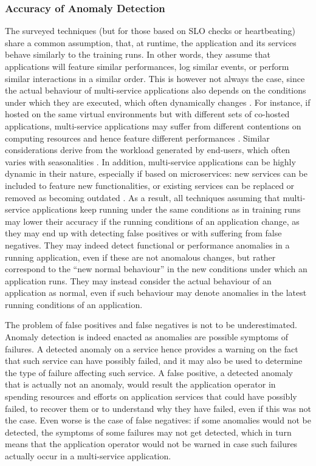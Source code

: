 \subsubsection{Accuracy of Anomaly Detection}
\label{sec:detection:discussion:adaptability}
The surveyed techniques (but for those based on SLO checks or heartbeating) share a common assumption, \viz that, at runtime, the application and its services behave similarly to the training runs.
In other words, they assume that applications will feature similar performances, log similar events, or perform similar interactions in a similar order. 
This is however not always the case, since the actual behaviour of multi-service applications also depends on the conditions under which they are executed, which often dynamically changes \cite{Soldani2018_MicroservicesPainsGains}.
For instance, if hosted on the same virtual environments but with different sets of co-hosted applications, multi-service applications may suffer from different contentions on computing resources and hence feature different performances \cite{Medel2018_ResourceManagementPerformanceKubernetes}.
Similar considerations derive from the workload generated by end-users, which often varies with seasonalities \cite{33_Mariani2020_PredictingFailures}.
In addition, multi-service applications can be highly dynamic in their nature, especially if based on microservices: new services can be included to feature new functionalities, or existing services can be replaced or removed as becoming outdated \cite{Soldani2018_MicroservicesPainsGains}.
As a result, all techniques assuming that multi-service applications keep running under the same conditions as in training runs may lower their accuracy if the running conditions of an application change, as they may end up with detecting false positives or with suffering from false negatives.
They may indeed detect functional or performance anomalies in a running application, even if these are not anomalous changes, but rather correspond to the \enquote{new normal behaviour} in the new conditions under which an application runs.
They may instead consider the actual behaviour of an application as normal, even if such behaviour may denote anomalies in the latest running conditions of an application.

The problem of false positives and false negatives is not to be underestimated.
Anomaly detection is indeed enacted as anomalies are possible symptoms of failures.
A detected anomaly on a service hence provides a warning on the fact that such service can have possibly failed, and it may also be used to determine the type of failure affecting such service. 
A false positive, \viz a detected anomaly that is actually not an anomaly, would result the application operator in spending resources and efforts on application services that could have possibly failed, \eg to recover them or to understand why they have failed, even if this was not the case. 
Even worse is the case of false negatives: if some anomalies would not be detected, the symptoms of some failures may not get detected, which in turn means that the application operator would not be warned in case such failures actually occur in a multi-service application.


